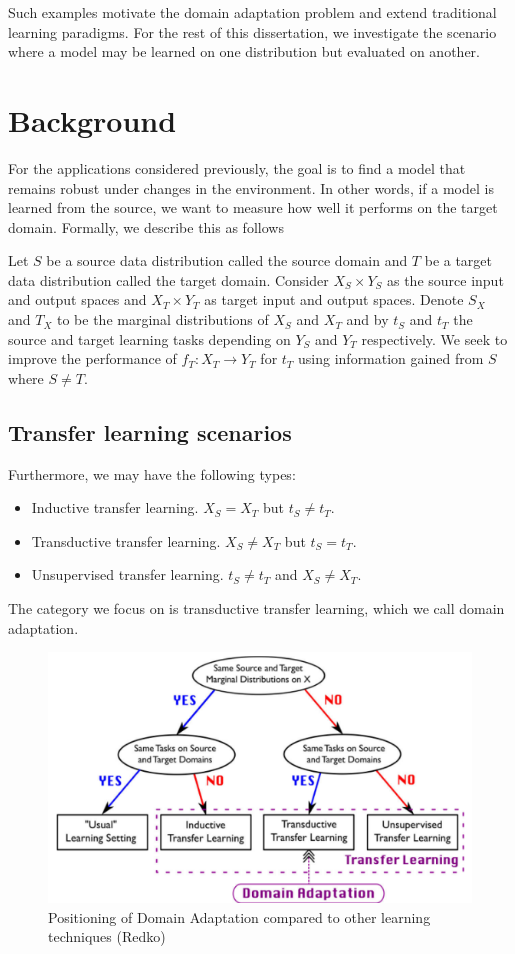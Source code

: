 Such examples motivate the domain adaptation problem and extend traditional learning paradigms. For the rest of this dissertation, we investigate the scenario where a model may be learned on one distribution but evaluated on another.

\section{Background}
For the applications considered previously, the goal is to find a model that remains robust under changes in the environment. In other words, if a model is learned from the source, we want to measure how well it performs on the target domain. Formally, we describe this as follows

\begin{theorem}
	Let $S$ be a source data distribution called the source domain and $T$ be a target data distribution called the target domain. Consider $X_S\times Y_S$ as the source input and output spaces and $X_T\times Y_T$ as target input and output spaces. Denote $S_X$ and $T_X$ to be the marginal distributions of $X_S$ and $X_T$ and by $t_S$ and $t_T$ the source and target learning tasks depending on $Y_S$ and $Y_T$ respectively. We seek to improve the performance of $f_{T}:X_T\to Y_T$ for $t_T$ using information gained from $S$ where $S\neq T$.
\end{theorem}

\subsection{Transfer learning scenarios}
 
Furthermore, we may have the following types:
\begin{itemize}
	\item Inductive transfer learning. $X_S=X_T$ but $t_S\neq t_T$.
	\item Transductive transfer learning. $X_S\neq X_T$ but $t_S=t_T$.
	\item Unsupervised transfer learning. $t_S\neq t_T$ and $X_S\neq X_T$.
\end{itemize}

The category we focus on is transductive transfer learning, which we call domain adaptation.

\begin{figure}
	\centering
	\includegraphics[width=0.7\linewidth]{pictures/DA_tree}
	\caption{Positioning of Domain Adaptation compared to other learning techniques (Redko)}
	\label{fig:datree}
\end{figure}


